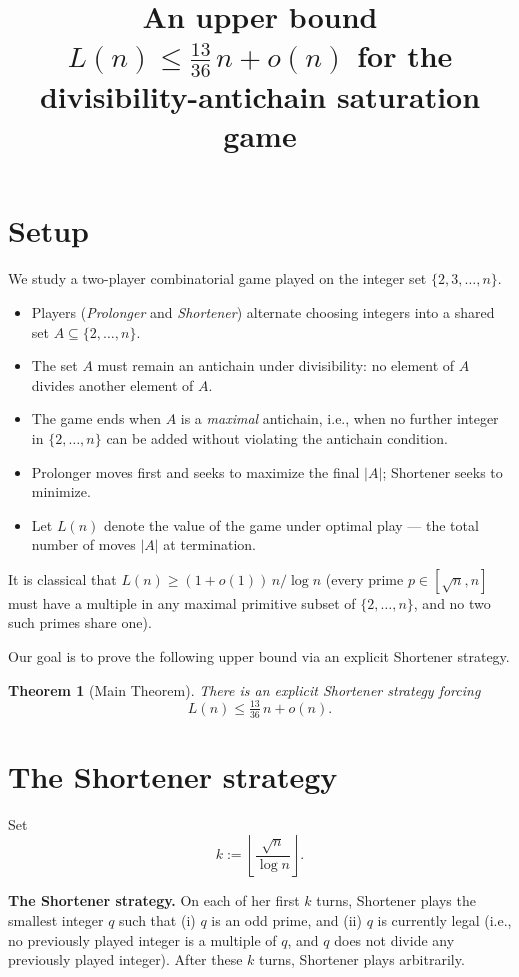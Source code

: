 \documentclass{article}
\title{An upper bound $L(n) \le \tfrac{13}{36}\,n + o(n)$ for the divisibility-antichain saturation game}
\newtheorem{theorem}{Theorem}
\begin{document}
\maketitle

\section{Setup}

We study a two-player combinatorial game played on the integer set $\{2, 3, \ldots, n\}$.

\begin{itemize}
  \item Players (\emph{Prolonger} and \emph{Shortener}) alternate choosing integers into a shared set $A \subseteq \{2, \ldots, n\}$.
  \item The set $A$ must remain an antichain under divisibility: no element of $A$ divides another element of $A$.
  \item The game ends when $A$ is a \emph{maximal} antichain, i.e., when no further integer in $\{2, \ldots, n\}$ can be added without violating the antichain condition.
  \item Prolonger moves first and seeks to maximize the final $|A|$; Shortener seeks to minimize.
  \item Let $L(n)$ denote the value of the game under optimal play — the total number of moves $|A|$ at termination.
\end{itemize}

It is classical that $L(n) \ge (1 + o(1))\,n/\log n$ (every prime $p \in [\sqrt{n}, n]$ must have a multiple in any maximal primitive subset of $\{2, \ldots, n\}$, and no two such primes share one).

Our goal is to prove the following upper bound via an explicit Shortener strategy.

\begin{theorem}[Main Theorem]
There is an explicit Shortener strategy forcing
\[
L(n) \le \tfrac{13}{36}\,n + o(n).
\]
\end{theorem}

\section{The Shortener strategy}

Set
\[
k := \left\lfloor \frac{\sqrt{n}}{\log n} \right\rfloor.
\]

\textbf{The Shortener strategy.} On each of her first $k$ turns, Shortener plays the smallest integer $q$ such that (i) $q$ is an odd prime, and (ii) $q$ is currently legal (i.e., no previously played integer is a multiple of $q$, and $q$ does not divide any previously played integer). After these $k$ turns, Shortener plays arbitrarily.
\end{document}
